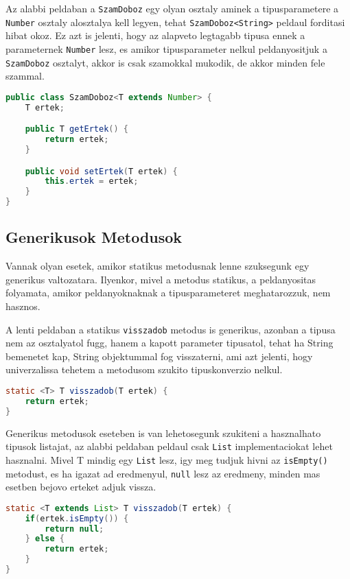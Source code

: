 \documentclass{article}
\let\l\lstinline
\begin{document}
Az alabbi peldaban a \l{SzamDoboz} egy olyan osztaly aminek a tipusparametere a \l{Number} osztaly alosztalya kell legyen, tehat \l{SzamDoboz<String>} peldaul forditasi hibat okoz. Ez azt is jelenti, hogy az alapveto legtagabb tipusa ennek a parameternek \l{Number} lesz, es amikor tipusparameter nelkul peldanyositjuk a \l{SzamDoboz} osztalyt, akkor is csak szamokkal mukodik, de akkor minden fele szammal.

\begin{lstlisting}[language=Java, caption=SzamDoboz osztaly]
public class SzamDoboz<T extends Number> {
	T ertek;

	public T getErtek() {
		return ertek;
	}

	public void setErtek(T ertek) {
		this.ertek = ertek;
	}
}
\end{lstlisting}

\subsection{Generikusok Metodusok}

Vannak olyan esetek, amikor statikus metodusnak lenne szuksegunk egy generikus valtozatara. Ilyenkor, mivel a metodus statikus, a peldanyositas folyamata, amikor peldanyoknaknak a tipusparameteret meghatarozzuk, nem hasznos.

A lenti peldaban a statikus \l{visszadob} metodus is generikus, azonban a tipusa nem az osztalyatol fugg, hanem a kapott parameter tipusatol, tehat ha String bemenetet kap, String objektummal fog visszaterni, ami azt jelenti, hogy univerzalissa tehetem a metodusom szukito tipuskonverzio nelkul.

\begin{lstlisting}[language=Java, caption=Generikus metodus]
static <T> T visszadob(T ertek) {
	return ertek;
}
\end{lstlisting}

Generikus metodusok eseteben is van lehetosegunk szukiteni a hasznalhato tipusok listajat, az alabbi peldaban peldaul csak \l{List} implementaciokat lehet hasznalni. Mivel T mindig egy \l{List} lesz, igy meg tudjuk hivni az \l{isEmpty()} metodust, es ha igazat ad eredmenyul, \l{null} lesz az eredmeny, minden mas esetben bejovo erteket adjuk vissza.

\begin{lstlisting}[language=Java, caption=Generikus metodus]
static <T extends List> T visszadob(T ertek) {
	if(ertek.isEmpty()) {
		return null;
	} else {
		return ertek;
	}
}
\end{lstlisting}
\end{document}

